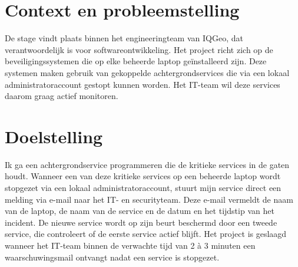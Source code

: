 

\section{Context en probleemstelling}%
\label{vst:context}


De stage vindt plaats binnen het engineeringteam van IQGeo, dat verantwoordelijk is voor softwareontwikkeling. Het project richt zich op de beveiligingssystemen die op elke beheerde laptop geïnstalleerd zijn. Deze systemen maken gebruik van gekoppelde achtergrondservices die via een lokaal administratoraccount gestopt kunnen worden. Het IT-team wil deze services daarom graag actief monitoren. 


\section{Doelstelling}%
\label{vst:doelstelling}


Ik ga een achtergrondservice programmeren die de kritieke services in de gaten houdt. Wanneer een van deze kritieke services op een beheerde laptop wordt stopgezet via een lokaal administratoraccount, stuurt mijn service direct een melding via e-mail naar het IT- en securityteam. Deze e-mail vermeldt de naam van de laptop, de naam van de service en de datum en het tijdstip van het incident.
De nieuwe service wordt op zijn beurt beschermd door een tweede service, die controleert of de eerste service actief blijft. Het project is geslaagd wanneer het IT-team binnen de verwachte tijd van 2 à 3 minuten een waarschuwingsmail ontvangt nadat een service is stopgezet.


